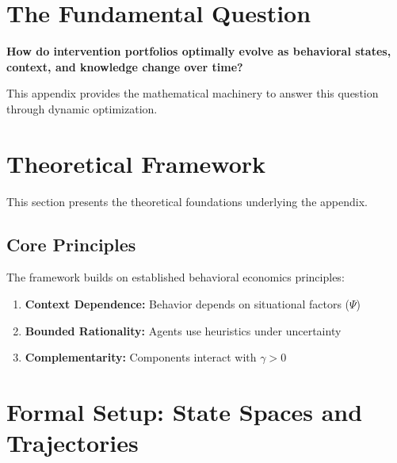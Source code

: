 \section{The Fundamental Question}
\label{sec:kkk-fundamental}

\begin{tcolorbox}[colback=red!5!white, colframe=red!75!black,
    title=\textbf{Fundamental Question}]
\textbf{How do intervention portfolios optimally evolve as behavioral states, context, and knowledge change over time?}

This appendix provides the mathematical machinery to answer this question through dynamic optimization.
\end{tcolorbox}


\section{Theoretical Framework}
\label{sec:kkk-theory}

This section presents the theoretical foundations underlying the appendix.

\subsection{Core Principles}

The framework builds on established behavioral economics principles:

\begin{enumerate}
    \item \textbf{Context Dependence:} Behavior depends on situational factors ($\Psi$)
    \item \textbf{Bounded Rationality:} Agents use heuristics under uncertainty
    \item \textbf{Complementarity:} Components interact with $\gamma > 0$
\end{enumerate}

\section{Formal Setup: State Spaces and Trajectories}
\label{sec:kkk-setup}
\label{sec:kkk-setup}

